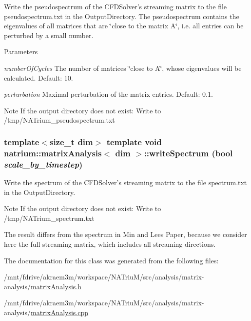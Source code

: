 Write the pseudospectrum of the CFDSolver's streaming matrix to the file pseudospectrum.txt in the OutputDirectory. The pseudospectrum contains the eigenvalues of all matrices that are \char`\"{}close to the matrix A\char`\"{}, i.e. all entries can be perturbed by a small number. 
\begin{DoxyParams}{Parameters}
\item[{\em numberOfCycles}]The number of matrices \char`\"{}close to A\char`\"{}, whose eigenvalues will be calculated. Default: 10. \item[{\em perturbation}]Maximal perturbation of the matrix entries. Default: 0.1. \end{DoxyParams}
\begin{DoxyNote}{Note}
If the output directory does not exist: Write to /tmp/NATrium\_\-pseudospectrum.txt 
\end{DoxyNote}
\hypertarget{classnatrium_1_1matrixAnalysis_ae774e069b53034a25ed633f789af625e}{
\subsubsection[{writeSpectrum}]{\setlength{\rightskip}{0pt plus 5cm}template$<$size\_\-t dim$>$ template void {\bf natrium::matrixAnalysis}$<$ dim $>$::writeSpectrum (bool {\em scale\_\-by\_\-timestep})}}
\label{classnatrium_1_1matrixAnalysis_ae774e069b53034a25ed633f789af625e}


Write the spectrum of the CFDSolver's streaming matrix to the file spectrum.txt in the OutputDirectory. \begin{DoxyNote}{Note}
If the output directory does not exist: Write to /tmp/NATrium\_\-spectrum.txt 

The result differs from the spectrum in Min and Lees Paper, because we consider here the full streaming matrix, which includes all streaming directions. 
\end{DoxyNote}


The documentation for this class was generated from the following files:\begin{DoxyCompactItemize}
\item 
/mnt/fdrive/akraem3m/workspace/NATriuM/src/analysis/matrix-\/analysis/\hyperlink{matrixAnalysis_8h}{matrixAnalysis.h}\item 
/mnt/fdrive/akraem3m/workspace/NATriuM/src/analysis/matrix-\/analysis/\hyperlink{matrixAnalysis_8cpp}{matrixAnalysis.cpp}\end{DoxyCompactItemize}
